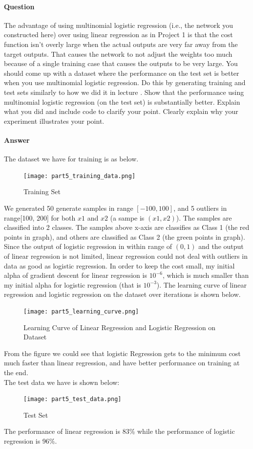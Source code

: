 \documentclass[11pt,twoside]{article}
\begin{document}
\paragraph{Question}
The advantage of using multinomial logistic regression (i.e., the network you constructed here) over using linear regression as in Project 1 is that the cost function isn’t overly large when the actual outputs are very far away from the target outputs. That causes the network to not adjust the weights too much because of a single training case that causes the outputs to be very large. You should come up with a dataset where the performance on the test set is better when you use multinomial logistic regression. Do this by generating training and test sets similarly to how we did it in lecture . Show that the performance using multinomial logistic regression (on the test set) is substantially better. Explain what you did and include code to clarify your point. Clearly explain why your experiment illustrates your point.

\paragraph{Answer}
The dataset we have for training is as below.
\begin{figure}[h]
	\centering
	\texttt{[image: part5\_training\_data.png]}
	\caption*{Training Set}
\end{figure}
We generated 50 generate samples in range $[-100, 100]$, and 5 outliers in range[100, 200] for both $x1$ and $x2$ (a sampe is $(x1, x2)$). The samples are classified into 2 classes. The samples above x-axis are classifies as Class 1 (the red points in graph), and others are classified as Class 2 (the green points in graph).\\
Since the output of logistic regression in within range of $(0, 1)$ and the output of linear regression is not limited, linear regression could not deal with outliers in data as good as logistic regression. In order to keep the cost small, my initial alpha of gradient descent for linear regression is $10^{-6}$, which is much smaller than my initial alpha for logistic regression (that is $10^{-3}$). The learning curve of linear regression and logistic regression on the dataset over iterations is shown below.
\begin{figure}[h]
	\centering
	\texttt{[image: part5\_learning\_curve.png]}
	\caption*{Learning Curve of Linear Regression and Logistic Regression on Dataset}
\end{figure}
From the figure we could see that logistic Regression gets to the minimum cost much faster than linear regression, and have better performance on training at the end.\\
The test data we have is shown below: 
\begin{figure}[h]
	\centering
	\texttt{[image: part5\_test\_data.png]}
	\caption*{Test Set}
\end{figure}
The performance of linear regression is 83\% while the performance of logistic regression is 96\%.
\clearpage
\end{document}
